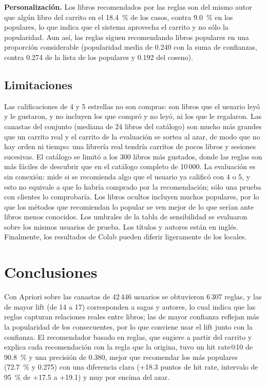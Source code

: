 \documentclass[11pt,letterpaper]{article}
\begin{document}
\textbf{Personalización.} Los libros recomendados por las reglas son del mismo autor que algún libro del carrito en el 18.4~\% de los casos, contra 9.0~\% en los populares, lo que indica que el sistema aprovecha el carrito y no sólo la popularidad. Aun así, las reglas siguen recomendando libros populares en una proporción considerable (popularidad media de 0.240 con la suma de confianzas, contra 0.274 de la lista de los populares y 0.192 del coseno).

\subsection{Limitaciones}

Las calificaciones de 4 y 5 estrellas no son compras: son libros que el usuario leyó y le gustaron, y no incluyen los que compró y no leyó, ni los que le regalaron. Las canastas del conjunto (mediana de 24 libros del catálogo) son mucho más grandes que un carrito real y el carrito de la evaluación se sortea al azar, de modo que no hay orden ni tiempo: una librería real tendría carritos de pocos libros y sesiones sucesivas. El catálogo se limitó a los 300 libros más gustados, donde las reglas son más fáciles de descubrir que en el catálogo completo de 10\,000. La evaluación es sin conexión: mide si se recomienda algo que el usuario ya calificó con 4 o 5, y esto no equivale a que lo habría comprado por la recomendación; sólo una prueba con clientes lo comprobaría. Los libros ocultos incluyen muchos populares, por lo que los métodos que recomiendan lo popular se ven mejor de lo que serían ante libros menos conocidos. Los umbrales de la tabla de sensibilidad se evaluaron sobre los mismos usuarios de prueba. Los títulos y autores están en inglés. Finalmente, los resultados de Colab pueden diferir ligeramente de los locales.

\section{Conclusiones}

Con Apriori sobre las canastas de 42\,446 usuarios se obtuvieron 6\,307 reglas, y las de mayor lift (de 14 a 17) corresponden a sagas y autores, lo cual indica que las reglas capturan relaciones reales entre libros; las de mayor confianza reflejan más la popularidad de los consecuentes, por lo que conviene usar el lift junto con la confianza. El recomendador basado en reglas, que sugiere a partir del carrito y explica cada recomendación con la regla que la origina, tuvo un hit rate@10 de 90.8~\% y una precisión de 0.380, mejor que recomendar los más populares (72.7~\% y 0.275) con una diferencia clara (+18.3 puntos de hit rate, intervalo de 95~\% de +17.5 a +19.1) y muy por encima del azar.
\end{document}
